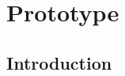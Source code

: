 %

\chapter{Prototype}
\label{chap1}
\graphicspath{ {./chapters/chap1images/} }
\section{Introduction}

